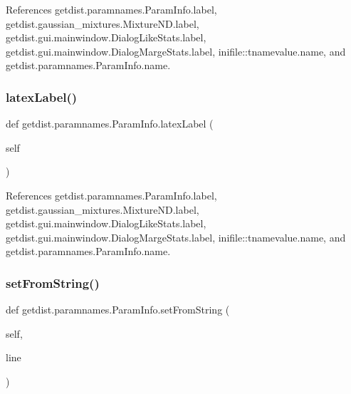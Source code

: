 References getdist.\+paramnames.\+Param\+Info.\+label, getdist.\+gaussian\+\_\+mixtures.\+Mixture\+N\+D.\+label, getdist.\+gui.\+mainwindow.\+Dialog\+Like\+Stats.\+label, getdist.\+gui.\+mainwindow.\+Dialog\+Marge\+Stats.\+label, inifile\+::tnamevalue.\+name, and getdist.\+paramnames.\+Param\+Info.\+name.

\mbox{\label{classgetdist_1_1paramnames_1_1ParamInfo_a7f0ccb0f7d6ed71f864ac8b33d352fe7}} 
\subsubsection{\texorpdfstring{latex\+Label()}{latexLabel()}}
{\footnotesize\ttfamily def getdist.\+paramnames.\+Param\+Info.\+latex\+Label (\begin{DoxyParamCaption}\item[{}]{self }\end{DoxyParamCaption})}



References getdist.\+paramnames.\+Param\+Info.\+label, getdist.\+gaussian\+\_\+mixtures.\+Mixture\+N\+D.\+label, getdist.\+gui.\+mainwindow.\+Dialog\+Like\+Stats.\+label, getdist.\+gui.\+mainwindow.\+Dialog\+Marge\+Stats.\+label, inifile\+::tnamevalue.\+name, and getdist.\+paramnames.\+Param\+Info.\+name.

\mbox{\label{classgetdist_1_1paramnames_1_1ParamInfo_a9959ca38efbef580c4322fe1003f49ae}} 
\subsubsection{\texorpdfstring{set\+From\+String()}{setFromString()}}
{\footnotesize\ttfamily def getdist.\+paramnames.\+Param\+Info.\+set\+From\+String (\begin{DoxyParamCaption}\item[{}]{self,  }\item[{}]{line }\end{DoxyParamCaption})}




